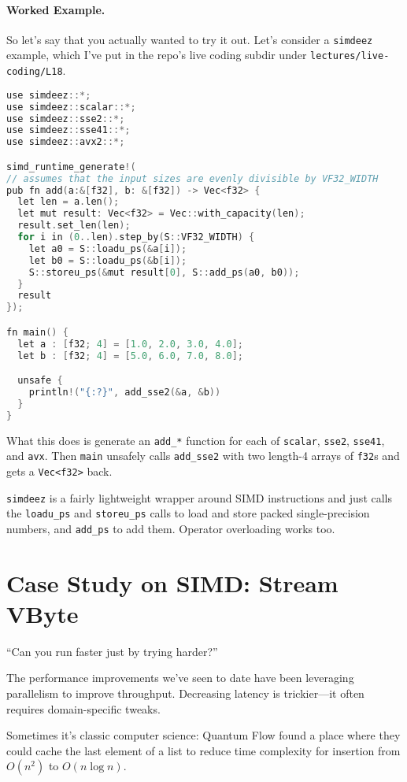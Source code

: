 \paragraph{Worked Example.} So let's say that you actually wanted to try it out. Let's consider a \texttt{simdeez} example, which I've put in the repo's live coding subdir under \texttt{lectures/live-coding/L18}.

\begin{lstlisting}[language=C]
use simdeez::*;
use simdeez::scalar::*;
use simdeez::sse2::*;
use simdeez::sse41::*;
use simdeez::avx2::*;

simd_runtime_generate!(
// assumes that the input sizes are evenly divisible by VF32_WIDTH
pub fn add(a:&[f32], b: &[f32]) -> Vec<f32> {
  let len = a.len();
  let mut result: Vec<f32> = Vec::with_capacity(len);
  result.set_len(len);
  for i in (0..len).step_by(S::VF32_WIDTH) {
    let a0 = S::loadu_ps(&a[i]);
    let b0 = S::loadu_ps(&b[i]);
    S::storeu_ps(&mut result[0], S::add_ps(a0, b0));
  }
  result
});

fn main() {
  let a : [f32; 4] = [1.0, 2.0, 3.0, 4.0];
  let b : [f32; 4] = [5.0, 6.0, 7.0, 8.0];

  unsafe {
    println!("{:?}", add_sse2(&a, &b))
  }
}
\end{lstlisting}
What this does is generate an \texttt{add\_*} function for each of \texttt{scalar},
\texttt{sse2}, \texttt{sse41}, and \texttt{avx}. Then \texttt{main}
unsafely calls \texttt{add\_sse2} with two length-4 arrays of \texttt{f32}s and
gets a \texttt{Vec<f32>} back.

\texttt{simdeez} is a fairly lightweight wrapper around SIMD instructions and just
calls the \texttt{loadu\_ps} and \texttt{storeu\_ps} calls to load and store
packed single-precision numbers, and \texttt{add\_ps} to add them. Operator overloading
works too.

\section*{Case Study on SIMD: Stream VByte }

\hfill ``Can you run faster just by trying harder?''

The performance improvements we've seen to date have been leveraging parallelism
to improve throughput. Decreasing latency is trickier---it often requires domain-specific
tweaks.

Sometimes it's classic computer science: Quantum Flow found a place
where they could cache the last element of a list to reduce time
complexity for insertion from $O(n^2)$ to $O(n \log n)$.


